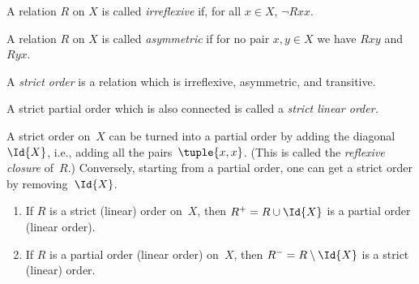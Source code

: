 \documentclass[../../../include/open-logic-section]{subfiles}
\begin{document}
\begin{defn}[Irreflexivity]
A relation $R$ on $X$ is called \emph{irreflexive} if, for all $x \in
X$, $ \lnot Rxx$. 
\end{defn}

\begin{defn}[Asymmetry]
A relation $R$ on $X$ is called \emph{asymmetric} if for no pair $x,y\in
X$ we have $Rxy$ and $Ryx$. 
\end{defn}

\begin{defn}
A \emph{strict order} is a relation which is irreflexive, asymmetric,
and transitive.
\end{defn}

\begin{defn}
A strict partial order which is also connected is called a
\emph{strict linear order.}
\end{defn}

A strict order on~$X$ can be turned into a partial order
by adding the diagonal $\Id{X}$, i.e., adding all the pairs~$\tuple{x,
  x}$.  (This is called the \emph{reflexive closure} of~$R$.)
Conversely, starting from a partial order, one can get a strict
order by removing~$\Id{X}$.

\begin{prop}
  \begin{enumerate}
  \item If $R$ is a strict (linear) order on~$X$, then $R^+ = R
    \cup \Id{X}$ is a partial order (linear order).
  \item If $R$ is a partial order (linear order) on~$X$, then $R^- = R
    \setminus \Id{X}$ is a strict (linear) order.
  \end{enumerate}
\end{prop}
\end{document}
